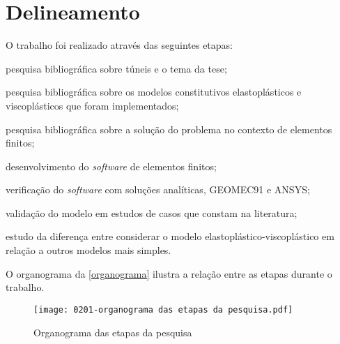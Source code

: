 \section{Delineamento}

O trabalho foi realizado através das seguintes etapas:

\begin{alineas}

	\item pesquisa bibliográfica sobre túneis e o tema da tese;
	
	\item pesquisa bibliográfica sobre os modelos constitutivos elastoplásticos e viscoplásticos que foram implementados;
	
	\item pesquisa bibliográfica sobre a solução do problema no contexto de elementos finitos;
	
	\item desenvolvimento do \textit{software} de elementos finitos;
	
	\item verificação do \textit{software} com soluções analíticas, GEOMEC91 e ANSYS;
	
	\item validação do modelo em estudos de casos que constam na literatura;
	
	\item estudo da diferença entre considerar o modelo elastoplástico-viscoplástico em relação a outros modelos mais simples.

\end{alineas}

O organograma da \autoref{organograma} ilustra a relação entre as etapas durante o trabalho.

\begin{figure}[H]
	\begin{center}
		\texttt{[image: 0201-organograma das etapas da pesquisa.pdf]}
	\end{center}
	\caption{\label{organograma}Organograma das etapas da pesquisa}
\end{figure}